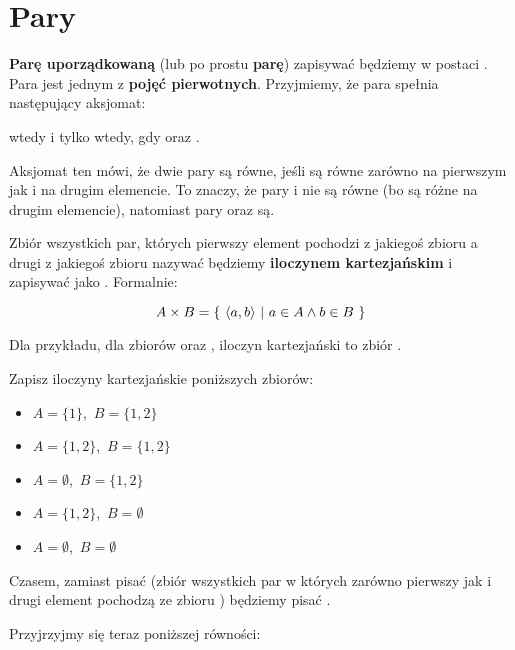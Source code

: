\section{Pary}

\textbf{Parę uporządkowaną} (lub po prostu \textbf{parę}) zapisywać będziemy w postaci . Para jest jednym z \textbf{pojęć pierwotnych}. Przyjmiemy, że para spełnia następujący aksjomat:
\begin{axiom}
 wtedy i tylko wtedy, gdy  oraz .
\end{axiom}

Aksjomat ten mówi, że dwie pary są równe, jeśli są równe zarówno na pierwszym jak i na drugim elemencie. To znaczy, że pary  i  nie są równe (bo są różne na drugim elemencie), natomiast pary  oraz  są.

Zbiór wszystkich par, których pierwszy element pochodzi z jakiegoś zbioru  a drugi z jakiegoś zbioru  nazywać będziemy \textbf{iloczynem kartezjańskim} i zapisywać jako . Formalnie:

\[
    A \times B = \{\ \langle a,b \rangle\ |\ a \in A \wedge b \in B\ \}
\]

Dla przykładu, dla zbiorów  oraz , iloczyn kartezjański   to zbiór .

\begin{ex}
Zapisz iloczyny kartezjańskie poniższych zbiorów:
\begin{itemize}
    \item \({ A = \{ 1 \} }\),~\({ B = \{ 1,2 \} }\)
    \item \({ A = \{ 1,2 \} }\),~\({ B = \{ 1,2 \} }\)
    \item \({ A = \emptyset }\),~\({ B = \{ 1,2 \} }\)
    \item \({ A = \{ 1,2 \} }\),~\({ B = \emptyset }\)
    \item \({ A = \emptyset }\),~\({ B = \emptyset }\)
\end{itemize}
\end{ex}

Czasem, zamiast pisać  (zbiór wszystkich par w których zarówno pierwszy jak i drugi element pochodzą ze zbioru ) będziemy pisać .

Przyjrzyjmy się teraz poniższej równości:

